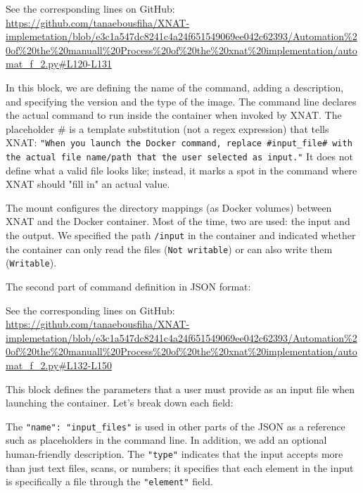 

\noindent\footnotesize See the corresponding lines on GitHub:\url{ https://github.com/tanaebousfiha/XNAT-implemetation/blob/e3c1a547dc8241c4a24f651549069ee042c62393/Automation%20of%20the%20manuall%20Process%20of%20the%20xnat%20implementation/automat_f_2.py#L120-L131}
\normalsize


In this block, we are defining the name of the command, adding a description, and specifying the version and the type of the image.
The command line declares the actual command to run inside the container when invoked by XNAT. The placeholder \# is a template substitution (not a regex expression) that tells XNAT: \texttt{"When you launch the Docker command, replace \#input\_file\# with the actual file name/path that the user selected as input."} It does not define what a valid file looks like; instead, it marks a spot in the command where XNAT should "fill in" an actual value.


The mount configures the directory mappings (as Docker volumes) between XNAT and the Docker container. Most of the time, two are used: the input and the output.
We specified the path \texttt{/input} in the container and indicated whether the container can only read the files (\texttt{Not writable}) or can also write them (\texttt{Writable}).

The second part of command definition in JSON format:




\noindent\footnotesize See the corresponding lines on GitHub: \url{ https://github.com/tanaebousfiha/XNAT-implemetation/blob/e3c1a547dc8241c4a24f651549069ee042c62393/Automation%20of%20the%20manuall%20Process%20of%20the%20xnat%20implementation/automat_f_2.py#L132-L150}
\normalsize

This block defines the parameters that a user must provide as an input file when launching the container.
Let’s break down each field:

The \texttt{"name": "input\_files"} is used in other parts of the JSON as a reference such as placeholders in the command line. In addition, we add an optional human-friendly description. The \texttt{"type"} indicates that the input accepts more than just text files, scans, or numbers; it specifies that each element in the input is specifically a file through the \texttt{"element"} field.

